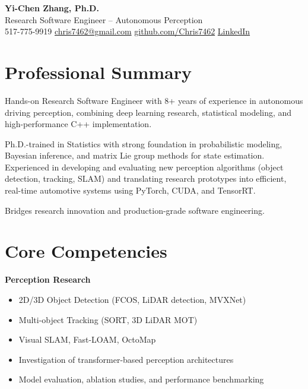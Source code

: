 \documentclass[11pt]{article}
\begin{document}
\begin{center}
    {\LARGE \textbf{Yi-Chen Zhang, Ph.D.}} \\
    Research Software Engineer – Autonomous Perception \\
    \vspace{4pt}
    517-775-9919 \quad
    \href{mailto:chris7462@gmail.com}{chris7462@gmail.com} \quad
    \href{https://github.com/Chris7462}{github.com/Chris7462} \quad
    \href{https://www.linkedin.com/in/yi-chen-zhang-b72907116/}{LinkedIn}
\end{center}

\section*{Professional Summary}

Hands-on Research Software Engineer with 8+ years of experience in autonomous driving perception, combining deep learning research, statistical modeling, and high-performance C++ implementation.

Ph.D.-trained in Statistics with strong foundation in probabilistic modeling, Bayesian inference, and matrix Lie group methods for state estimation. Experienced in developing and evaluating new perception algorithms (object detection, tracking, SLAM) and translating research prototypes into efficient, real-time automotive systems using PyTorch, CUDA, and TensorRT.

Bridges research innovation and production-grade software engineering.

\section*{Core Competencies}

\textbf{Perception Research}
\begin{itemize}[leftmargin=*]
\item 2D/3D Object Detection (FCOS, LiDAR detection, MVXNet)
\item Multi-object Tracking (SORT, 3D LiDAR MOT)
\item Visual SLAM, Fast-LOAM, OctoMap
\item Investigation of transformer-based perception architectures
\item Model evaluation, ablation studies, and performance benchmarking
\end{itemize}
\end{document}
